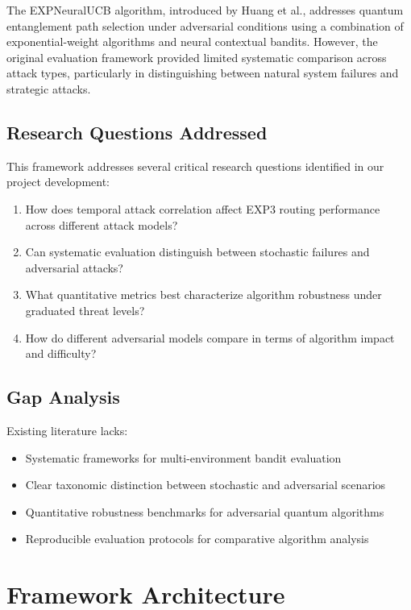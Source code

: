 \documentclass[11pt,a4paper]{article}
\begin{document}
The EXPNeuralUCB algorithm, introduced by Huang et al., addresses quantum entanglement path selection under adversarial conditions using a combination of exponential-weight algorithms and neural contextual bandits. However, the original evaluation framework provided limited systematic comparison across attack types, particularly in distinguishing between natural system failures and strategic attacks.

\subsection{Research Questions Addressed}

This framework addresses several critical research questions identified in our project development:

\begin{enumerate}
\item How does temporal attack correlation affect EXP3 routing performance across different attack models?
\item Can systematic evaluation distinguish between stochastic failures and adversarial attacks?
\item What quantitative metrics best characterize algorithm robustness under graduated threat levels?
\item How do different adversarial models compare in terms of algorithm impact and difficulty?
\end{enumerate}

\subsection{Gap Analysis}

Existing literature lacks:
\begin{itemize}
\item Systematic frameworks for multi-environment bandit evaluation
\item Clear taxonomic distinction between stochastic and adversarial scenarios
\item Quantitative robustness benchmarks for adversarial quantum algorithms
\item Reproducible evaluation protocols for comparative algorithm analysis
\end{itemize}

\section{Framework Architecture}
\end{document}
